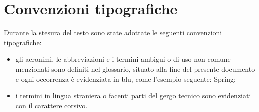 \section*{Convenzioni tipografiche}
Durante la stesura del testo sono state adottate le seguenti convenzioni tipografiche:
\begin{itemize}
	\item gli acronimi, le abbreviazioni e i termini ambigui o di uso non comune menzionati
	sono definiti nel glossario, situato alla fine del presente documento e ogni
	occorrenza è evidenziata in blu, come l'esempio seguente: \gls{Spring};
	\item i termini in lingua straniera o facenti parti del gergo tecnico sono evidenziati con
	il carattere corsivo.
\end{itemize}

%
%

\endgroup			

\vfill

